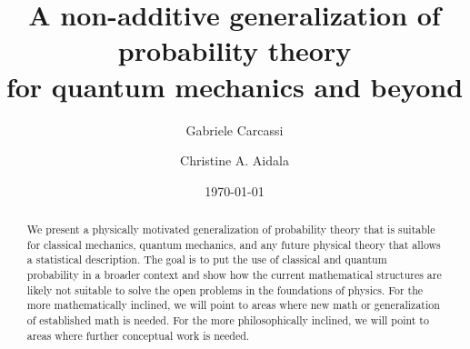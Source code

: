 \documentclass[10pt,twocolumn, nofootinbib]{revtex4-2}
\begin{document}
\title{A non-additive generalization of probability theory\\for quantum mechanics and beyond}
\author{Gabriele Carcassi}
\author{Christine A. Aidala}

\date{\today}


\begin{abstract}
	We present a physically motivated generalization of probability theory that is suitable for classical mechanics, quantum mechanics, and any future physical theory that allows a statistical description. The goal is to put the use of classical and quantum probability in a broader context and show how the current mathematical structures are likely not suitable to solve the open problems in the foundations of physics. For the more mathematically inclined, we will point to areas where new math or generalization of established math is needed. For the more philosophically inclined, we will point to areas where further conceptual work is needed.

	
\end{abstract}

\maketitle
\end{document}
